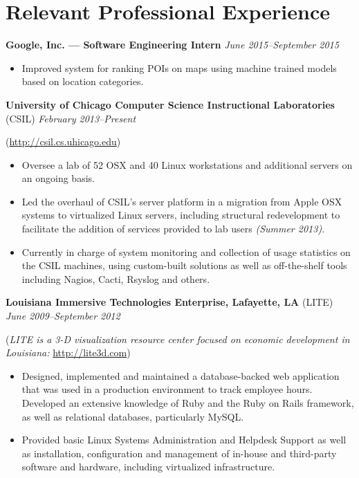 \documentclass[10pt,letterpaper]{article} %
\begin{document}
    \section*{Relevant Professional Experience} 
        \textbf{Google, Inc. --- Software Engineering Intern} \hfill \textit{June 2015--September 2015} 
            \begin{itemize} 
            \item Improved system for ranking POIs on maps using machine trained models based on location categories.
            \end{itemize} 
            \vspace{1em}
        \textbf{University of Chicago Computer Science Instructional Laboratories} (CSIL) \hfill \textit{February 2013--Present }
            \begin{footnotesize}
                (\url{http://csil.cs.uhicago.edu})
            \end{footnotesize}
            \begin{itemize}
            \item Oversee a lab of 52 OSX and 40 Linux workstations and additional servers on an ongoing basis.
            \item Led the overhaul of CSIL's server platform in a migration from Apple OSX systems to virtualized Linux servers, including structural redevelopment to facilitate the addition of services provided to lab users \textit{(Summer 2013)}. 
            \item Currently in charge of system monitoring and collection of usage statistics on the CSIL machines, using custom-built solutions as well as off-the-shelf tools including Nagios, Cacti, Rsyslog and others. 
            \end{itemize}
            \vspace{1em}

        \textbf{Louisiana Immersive Technologies Enterprise, Lafayette, LA} (LITE) \hfill \textit{June 2009--September 2012} 

            \begin{footnotesize}
                (\textit{LITE is a 3-D visualization resource center focused on economic development in Louisiana: }\url{http://lite3d.com})
            \end{footnotesize}
            \begin{itemize} 
            \item  Designed, implemented and maintained a database-backed web application that was used in a production environment to track 
                   employee hours. Developed an extensive knowledge of Ruby and the 
                   Ruby on Rails framework, as well as relational databases, particularly MySQL.
            \item  Provided basic Linux Systems Administration and Helpdesk Support as well as installation, configuration and 
                   management of in-house and third-party software and hardware, including virtualized infrastructure.
            \end{itemize} 
\end{document}
